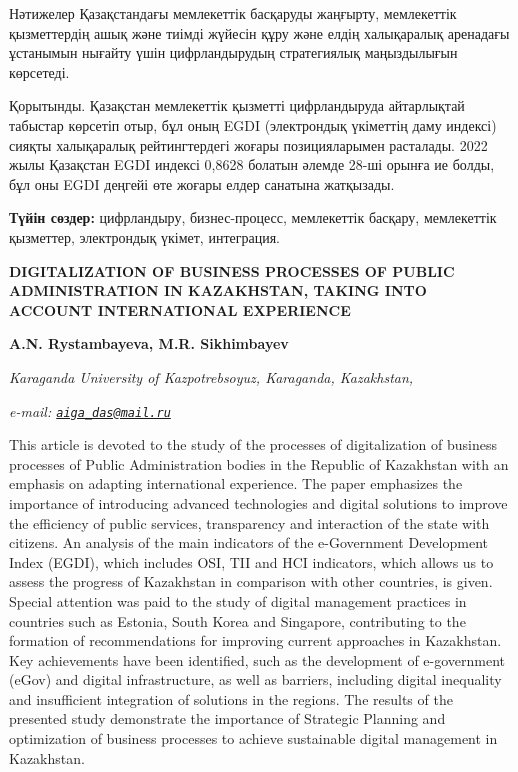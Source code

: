 Нәтижелер Қазақстандағы мемлекеттік басқаруды жаңғырту, мемлекеттік
қызметтердің ашық және тиімді жүйесін құру және елдің халықаралық
аренадағы ұстанымын нығайту үшін цифрландырудың стратегиялық
маңыздылығын көрсетеді.

Қорытынды. Қазақстан мемлекеттік қызметті цифрландыруда айтарлықтай
табыстар көрсетіп отыр, бұл оның EGDI (электрондық үкіметтің даму
индексі) сияқты халықаралық рейтингтердегі жоғары позицияларымен
расталады. 2022 жылы Қазақстан EGDI индексі 0,8628 болатын әлемде 28-ші
орынға ие болды, бұл оны EGDI деңгейі өте жоғары елдер санатына
жатқызады.

{\bfseries Түйін сөздер:} цифрландыру, бизнес-процесс, мемлекеттік басқару,
мемлекеттік қызметтер, электрондық үкімет, интеграция.

\begin{articleheader}
{\bfseries DIGITALIZATION OF BUSINESS PROCESSES OF PUBLIC ADMINISTRATION IN KAZAKHSTAN, TAKING INTO ACCOUNT INTERNATIONAL EXPERIENCE}

{\bfseries  
A.N. Rystambayeva\textsuperscript{\envelope },  
M.R. Sikhimbayev}
\end{articleheader}

\begin{affiliation}
\emph{Karaganda University of Kazpotrebsoyuz, Karaganda, Kazakhstan,}

\emph{e-mail: \href{mailto:aiga_das@mail.ru}{\nolinkurl{aiga\_das@mail.ru}}}
\end{affiliation}

This article is devoted to the study of the processes of digitalization
of business processes of Public Administration bodies in the Republic of
Kazakhstan with an emphasis on adapting international experience. The
paper emphasizes the importance of introducing advanced technologies and
digital solutions to improve the efficiency of public services,
transparency and interaction of the state with citizens. An analysis of
the main indicators of the e-Government Development Index (EGDI), which
includes OSI, TII and HCI indicators, which allows us to assess the
progress of Kazakhstan in comparison with other countries, is given.
Special attention was paid to the study of digital management practices
in countries such as Estonia, South Korea and Singapore, contributing to
the formation of recommendations for improving current approaches in
Kazakhstan. Key achievements have been identified, such as the
development of e-government (eGov) and digital infrastructure, as well
as barriers, including digital inequality and insufficient integration
of solutions in the regions. The results of the presented study
demonstrate the importance of Strategic Planning and optimization of
business processes to achieve sustainable digital management in
Kazakhstan.

